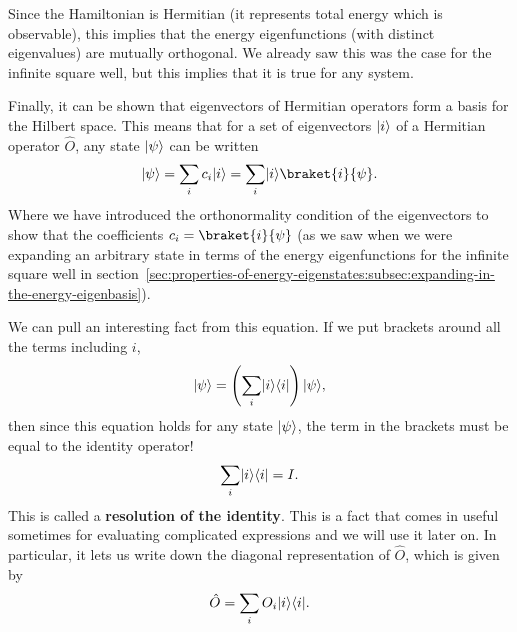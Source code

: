 \documentclass[../quantum_mechanics.tex]{subfiles}
\begin{document}
            Since the Hamiltonian is Hermitian (it represents total energy which is observable), this implies that the energy eigenfunctions (with distinct eigenvalues) are mutually orthogonal.
            We already saw this was the case for the infinite square well, but this implies that it is true for any system.

            Finally, it can be shown that eigenvectors of Hermitian operators form a basis for the Hilbert space.
            This means that for a set of eigenvectors $\lvert i\rangle$ of a Hermitian operator $\hat{O}$, any state $\lvert\psi\rangle$ can be written
            \begin{equation}
                \ket{\psi}=\sum_i c_i\ket{i}=\sum_i\ket{i}\braket{i}{\psi}.
            \end{equation}
            Where we have introduced the orthonormality condition of the eigenvectors to show that the coefficients $c_i=\braket{i}{\psi}$ (as we saw when we were expanding an arbitrary state in terms of the energy eigenfunctions for the infinite square well in section~\ref{sec:properties-of-energy-eigenstates:subsec:expanding-in-the-energy-eigenbasis}).

            We can pull an interesting fact from this equation.
            If we put brackets around all the terms including $i$, 
            \begin{equation}
                \lvert\psi\rangle=\left(\sum_i\lvert i\rangle\langle i\rvert\right)\lvert\psi\rangle,
            \end{equation}
            then since this equation holds for any state $\lvert\psi\rangle$, the term in the brackets must be equal to the identity operator!
            \begin{equation}
                \sum_i\lvert i\rangle\langle i\rvert=I.
            \end{equation}
            This is called a \textbf{resolution of the identity}.
            This is a fact that comes in useful sometimes for evaluating complicated expressions and we will use it later on.
            In particular, it lets us write down the diagonal representation of $\hat{O}$, which is given by
            \begin{equation}
                \hat{O}=\sum_i O_i\lvert i\rangle\langle i\rvert.
            \end{equation}
\end{document}
